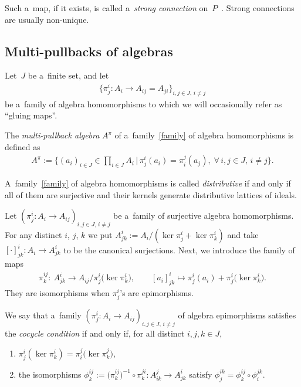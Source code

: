 \documentclass[pdftex]{sigma}
\begin{document}
Such a~map, if it exists, is called a~{\em strong connection} on~$P$~\cite{bh04,dgh01, h-pm96}.
Strong connections are usually non-unique.

\subsection{Multi-pullbacks of algebras}

Let~$J$ be a~f\/inite set, and let
\begin{gather}
\label{family}
\big\{\pi^i_j:A_i\longrightarrow A_{ij}=A_{ji}\big\}_{i,j\in J,\,i\neq j}
\end{gather}
be a~family of algebra homomorphisms to which we will occasionally refer as ``gluing maps''.
\begin{definition}
[\cite{CM2000,GK-P99}] The \emph{multi-pullback algebra} $A^\pi$ of a~family~\eqref{family} of algebra homomorphisms is
def\/ined as
\begin{gather*}
A^\pi:=\bigg\{ (a_i)_{i\in J}\in\prod\limits_{i\in J}A_i
\,
\bigg|
\,
\pi^i_j(a_i)=\pi^j_i(a_j),
\;
\forall\, i,j\in J,\, i\neq j \bigg\}.
\end{gather*}
\end{definition}

\begin{definition} A~family~\eqref{family} of algebra homomorphisms is called \emph{distributive} if and only if all of
them are surjective and their kernels generate distributive lattices of ideals.
\end{definition}

Let $(\pi^i_j:A_i\rightarrow A_{ij})_{i,j\in J,\,i\neq j}$ be a~family of surjective algebra homomorphisms.
For any distinct $i$, $j$, $k$ we put $A^i_{jk}:=A_i/(\ker\pi^i_j+\ker\pi^i_k)$ and take $[\cdot]^i_{jk}:A_i\rightarrow
A^i_{jk}$ to be the canonical surjections.
Next, we introduce the family of maps
\begin{gather*}
\pi^{ij}_k: \ A^i_{jk}\longrightarrow A_{ij}/\pi^i_j\big(\ker\pi^i_k\big),
\qquad
[a_i]^i_{jk}\longmapsto\pi^i_j(a_i)+\pi^i_j\big(\ker\pi^i_k\big).
\end{gather*}
They are isomorphisms when $\pi^i_j$'s are epimorphisms.

\begin{definition}
\label{cocycle-def}
We say \cite[Proposition~9]{CM2000} that a~family $(\pi^i_j:A_i\rightarrow A_{ij})_{i,j\in J,\,i\neq j}$ of algebra
epimorphisms satisf\/ies the {\em cocycle condition} if and only if, for all distinct $i,j,k\in J$,
\begin{enumerate}\itemsep=0pt
\item[1)] $\pi^i_j(\ker\pi^i_k)=\pi^j_i\big(\ker\pi^j_k\big)$,
\item[2)] the isomorphisms $\phi^{ij}_k:=\big(\pi^{ij}_k\big)^{-1}\circ\pi^{ji}_k:A^j_{ik}\rightarrow A^i_{jk}$ satisfy
$\phi^{ik}_j=\phi^{ij}_k\circ\phi^{jk}_i$.
\end{enumerate}
\end{definition}
\end{document}

